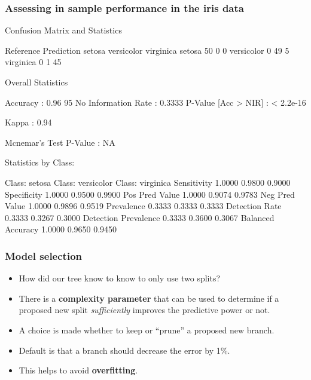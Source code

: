 \documentclass[a4paper]{article}\usepackage[]{graphicx}\usepackage[]{xcolor}
\begin{document}
\subsubsection{Assessing in sample performance in the iris data}
\begin{Schunk}
\begin{Soutput}
Confusion Matrix and Statistics

            Reference
Prediction   setosa versicolor virginica
  setosa         50          0         0
  versicolor      0         49         5
  virginica       0          1        45

Overall Statistics
                                         
               Accuracy : 0.96           
                 95%
    No Information Rate : 0.3333         
    P-Value [Acc > NIR] : < 2.2e-16      
                                         
                  Kappa : 0.94           
                                         
 Mcnemar's Test P-Value : NA             

Statistics by Class:

                     Class: setosa Class: versicolor Class: virginica
Sensitivity                 1.0000            0.9800           0.9000
Specificity                 1.0000            0.9500           0.9900
Pos Pred Value              1.0000            0.9074           0.9783
Neg Pred Value              1.0000            0.9896           0.9519
Prevalence                  0.3333            0.3333           0.3333
Detection Rate              0.3333            0.3267           0.3000
Detection Prevalence        0.3333            0.3600           0.3067
Balanced Accuracy           1.0000            0.9650           0.9450
\end{Soutput}
\end{Schunk}
\subsubsection{Model selection}
\begin{itemize}
	\item How did our tree know to know to only use two splits?
	\item There is a \textbf{complexity parameter} that can be used to determine if a proposed new split \textit{sufficiently} improves the predictive power or not.
	\item A choice is made whether to keep or ``prune'' a proposed new branch.
	\item Default is that a branch should decrease the error by 1\%.
	\item This helps to avoid \textbf{overfitting}.
\end{itemize}
\end{document}
